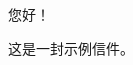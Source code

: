 \documentclass{classicletter}
\begin{document}
\makeletteropening

您好！

这是一封示例信件。

\makeletterclosing
\end{document}
